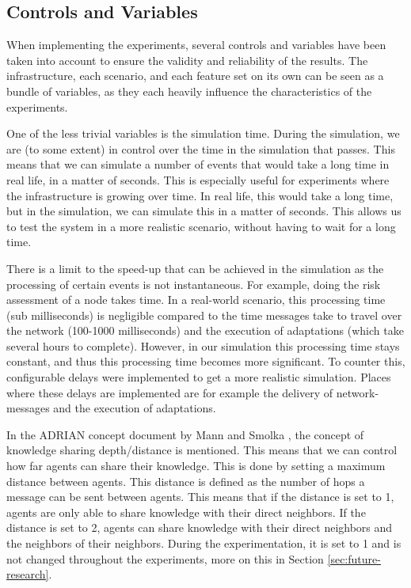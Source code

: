\subsection{Controls and Variables}
\label{ssec:controls-variables}

When implementing the experiments, several controls and variables have been taken into account to ensure the validity and reliability of the results. The infrastructure, each scenario, and each feature set on its own can be seen as a bundle of variables, as they each heavily influence the characteristics of the experiments. 


\label{sssec:simulation-time}
One of the less trivial variables is the simulation time. During the simulation, we are (to some extent) in control over the time in the simulation that passes. This means that we can simulate a number of events that would take a long time in real life, in a matter of seconds. This is especially useful for  experiments where the infrastructure is growing over time. In real life, this would take a long time, but in the simulation, we can simulate this in a matter of seconds. This allows us to test the system in a more realistic scenario, without having to wait for a long time.

There is a limit to the speed-up that can be achieved in the simulation as the processing of certain events is not instantaneous. For example, doing the risk assessment of a node takes time. In a real-world scenario, this processing time (sub milliseconds) is negligible compared to the time messages take to travel over the network (100-1000 milliseconds) and the execution of adaptations (which take several hours to complete). However, in our simulation this processing time stays constant, and thus this processing time becomes more significant. To counter this, configurable delays were implemented to get a more realistic simulation. 
Places where these delays are implemented are for example the delivery of network-messages and the execution of adaptations. 

\label{sssec:knowledge-depth}
In the ADRIAN concept document by Mann and Smolka \cite{mann2023ADRIAN}, the concept of knowledge sharing depth/distance is mentioned.  This means that we can control how far agents can share their knowledge. This is done by setting a maximum distance between agents. This distance is defined as the number of hops a message can be sent between agents. This means that if the distance is set to 1, agents are only able to share knowledge with their direct neighbors. If the distance is set to 2, agents can share knowledge with their direct neighbors and the neighbors of their neighbors. During the experimentation, it is set to 1 and is not changed throughout the experiments, more on this in Section \ref{sec:future-research}.

